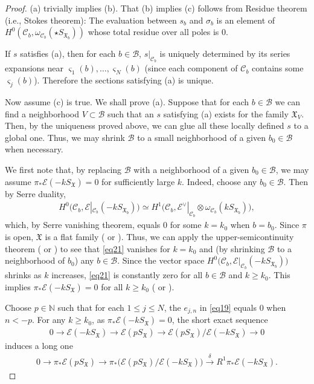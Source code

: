 \documentclass[12pt,a4paper,notitlepage]{article}
\theoremstyle{definition}
\theoremstyle{plain}
\newcommand{\fk}{\mathfrak}
\newcommand{\mc}{\mathcal}
\newcommand{\scr}{\mathscr}
\newcommand{\sgm}{\varsigma}
\newcommand{\SX}{{S_{\fk X}}}
\numberwithin{equation}{section}
\begin{document}
\begin{proof}
(a) trivially implies (b). That (b) implies (c) follows from Residue theorem (i.e., Stokes theorem): The evaluation between $s_b$ and $\sigma_b$ is an element of $H^0(\mc C_b,\omega_{\mc C_b}(\star S_{\fk X_b}))$ whose total residue over all poles is $0$.
	
If $s$ satisfies (a), then for each $b\in\mc B$, $s|_{\mc C_b}$ is uniquely determined by its series expansions near $\sgm_1(b),\dots,\sgm_N(b)$ (since each component of $\mc C_b$ contains some $\sgm_j(b)$). Therefore the sections satisfying (a) is unique.
	
Now assume (c) is true. We shall prove (a).  Suppose that for each $b\in\mc B$ we can find a neighborhood $V\subset\mc B$ such that an $s$ satisfying (a) exists for the family $\fk X_V$. Then, by the uniqueness proved above, we can glue all these locally defined $s$ to a global one. Thus, we may shrink $\mc B$ to a small neighborhood of a given $b_0\in\mc B$ when necessary. 

We first note that, by replacing $\mc B$ with a neighborhood of a given $b_0\in\mc B$, we may assume $\pi_*\scr E(-k\SX)=0$ for sufficiently large $k$. Indeed, choose any $b_0\in\mc B$. Then by Serre duality,
\begin{align}
H^0\big(\mc C_b,\scr E|_{\mc C_b}(-kS_{\fk X_b})\big)\simeq H^1\big(\mc C_b,\scr E^\vee|_{\mc C_b}\otimes\omega_{\mc C_b}(kS_{\fk X_b})\big),	\label{eq21}
\end{align}
which, by Serre vanishing theorem, equals $0$ for some $k=k_0$ when $b=b_0$. Since $\pi$ is open, $\fk X$ is a flat family (\cite[Thm. II.2.13]{GPR} or \cite[Sec. 3.20]{Fis76}). Thus, we can apply the upper-semicontinuity theorem (\cite[Thm. III.4.7]{GPR} or \cite[Thm. III.4.12]{BS76}) to see that \eqref{eq21} vanishes for $k=k_0$ and (by shrinking $\mc B$ to a neighborhood of $b_0$) any $b\in\mc B$. Since the vector space $H^0\big(\mc C_b,\scr E|_{\mc C_b}(-kS_{\fk X_b})\big)$ shrinks as $k$ increases, \eqref{eq21} is constantly zero for all $b\in\mc B$ and $k\geq k_0$. This implies $\pi_*\scr E(-k\SX)=0$ for all $k\geq k_0$ (\cite[Thm. III.4.7-(d)]{GPR} or \cite[Cor. III.3.5]{BS76}).
	
Choose $p\in\mathbb N$ such that for each $1\leq j\leq N$, the $e_{j,n}$ in \eqref{eq19} equals $0$ when $n<-p$. For any $k\geq k_0$, as $\pi_*\scr E(-k\SX)=0$, the short exact sequence
\begin{align*}
0\rightarrow \scr E(-k\SX)\rightarrow \scr E(p\SX)\rightarrow \scr E(p\SX)/\scr E(-k\SX)\rightarrow 0
\end{align*}
induces a long one
\begin{align}
0\rightarrow\pi_*\scr E(p\SX)\rightarrow \pi_*\big(\scr E(p\SX)/\scr E(-k\SX)\big)\xrightarrow{\delta}R^1\pi_*\scr E(-k\SX).\label{eq22}
\end{align}



\end{proof}
\end{document}
